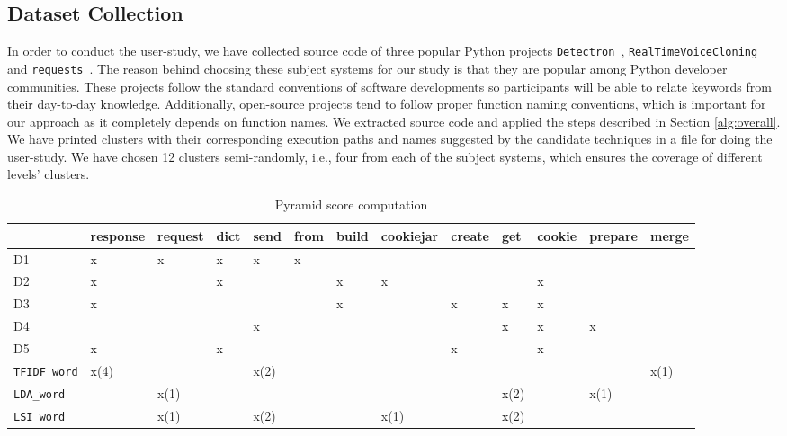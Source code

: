 \subsection{Dataset Collection}
In order to conduct the user-study, we have collected source code of three popular Python projects \texttt{Detectron}~\cite{Detectron2018}, \texttt{Real\-Time\-Voice\-Cloning}~\cite{realTime} and \texttt{requests}~\cite{requests}. The reason behind choosing these subject systems for our study is that they are popular among Python developer communities. These projects follow the standard conventions of software developments so participants will be able to relate keywords from their day-to-day knowledge. Additionally, open-source projects tend to follow proper function naming conventions, which is important for our approach as it completely depends on function names. We extracted source code and applied the steps described in Section \ref{alg:overall}. We have printed clusters with their corresponding execution paths and names suggested by the candidate techniques in a file for doing the user-study. We have chosen 12 clusters semi-randomly, i.e.,  four from each of the subject systems, which ensures the coverage of different levels' clusters. 

\begin{table}[h]
\small
\caption{Pyramid score computation }
\label{table-pyramid1}
\centering
\begin{tabular}{|l|l|l|l|l|l|l|l|l|l|l|l|l|}
\hline
  & response & request &	dict &	send &	from &	build &	cookiejar &	create &	get &	cookie &	prepare &	merge  \\ \hline
D1 & x      & x     & x           & x   & x    &        &         &     &      &    &  &    \\ \hline
D2 &     x   &      &  x       &     &    & x      & x       &   &      & x& &       \\ \hline
D3 & x      &       &           &    &     &    x    &         & x   &  x    & x & &     \\ \hline
D4 &        &       &             &   x  &     &        &        &     & x    & x    & x &    \\ \hline
D5 &  x     &      &    x         &     &     &        &        & x    &     & x    &  &   \\ \hline
\texttt{TFIDF\_word}  &   x(4)     &       &             &  x(2)   &  &        &     &     &  &  & & x(1)    \\ \hline
\texttt{LDA\_word}  &        &   x(1)    &             &     &  &        &     &     & x(2) &   & x(1) &  \\ \hline
\texttt{LSI\_word}  &        &   x(1)    &             &  x(2)   &   &        &  x(1)     &     & x(2) &  & & \\ \hline
\end{tabular}
\end{table}

